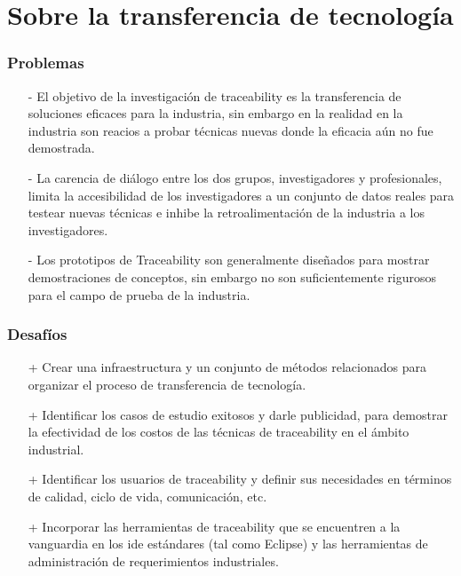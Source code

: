\documentclass[a4paper,12pt,oneside,spanish]{book}
\begin{document}
\section{Sobre la transferencia de tecnología}

\subsubsection{Problemas}

\begin{itemize}

\item[-] El objetivo de la investigación de traceability es la transferencia de soluciones eficaces para la industria, sin embargo en la realidad en la industria son reacios a probar técnicas nuevas donde la eficacia aún no fue demostrada.

\item[-] La carencia de diálogo entre los dos grupos, investigadores y profesionales, limita la accesibilidad de los investigadores a un conjunto de datos reales para testear nuevas técnicas e inhibe la retroalimentación de la industria a los investigadores.

\item[-] Los prototipos de Traceability son generalmente diseñados para mostrar demostraciones de conceptos, sin embargo no son suficientemente rigurosos para el campo de prueba de la industria.

\end{itemize}

\subsubsection{Desafíos}

\begin{itemize}

\item[+] Crear una infraestructura y un conjunto de métodos relacionados para organizar el proceso de transferencia de tecnología.

\item[+] Identificar los casos de estudio exitosos y darle publicidad, para demostrar la efectividad de los costos de las técnicas de traceability en el ámbito industrial.

\item[+] Identificar los usuarios de traceability y definir sus necesidades en términos de calidad, ciclo de vida, comunicación, etc.

\item[+] Incorporar las herramientas de traceability que se encuentren a la vanguardia en los \gls{ide} estándares (tal como Eclipse) y las herramientas de administración de requerimientos industriales.

\end{itemize}
\end{document}
